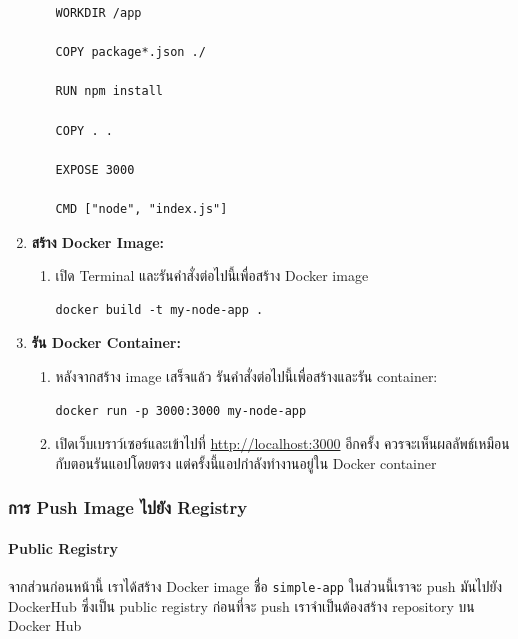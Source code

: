 \begin{enumerate}
\begin{enumerate}
\begin{verbatim}
WORKDIR /app

COPY package*.json ./

RUN npm install

COPY . .

EXPOSE 3000

CMD ["node", "index.js"]
        \end{verbatim}
            \end{enumerate}

      \item \textbf{สร้าง Docker Image:}
            \begin{enumerate}
                  \item เปิด Terminal และรันคำสั่งต่อไปนี้เพื่อสร้าง Docker image
                        \begin{verbatim}
docker build -t my-node-app .
        \end{verbatim}
            \end{enumerate}

      \item \textbf{รัน Docker Container:}
            \begin{enumerate}
                  \item หลังจากสร้าง image เสร็จแล้ว รันคำสั่งต่อไปนี้เพื่อสร้างและรัน container:
                        \begin{verbatim}
docker run -p 3000:3000 my-node-app
        \end{verbatim}
                  \item เปิดเว็บเบราว์เซอร์และเข้าไปที่ \url{http://localhost:3000} อีกครั้ง ควรจะเห็นผลลัพธ์เหมือนกับตอนรันแอปโดยตรง แต่ครั้งนี้แอปกำลังทำงานอยู่ใน Docker container
            \end{enumerate}
\end{enumerate}

\subsubsection{การ Push Image ไปยัง Registry}

\paragraph{Public Registry}
จากส่วนก่อนหน้านี้ เราได้สร้าง Docker image ชื่อ \texttt{simple-app} ในส่วนนี้เราจะ push มันไปยัง DockerHub ซึ่งเป็น public registry
ก่อนที่จะ push เราจำเป็นต้องสร้าง repository บน Docker Hub

